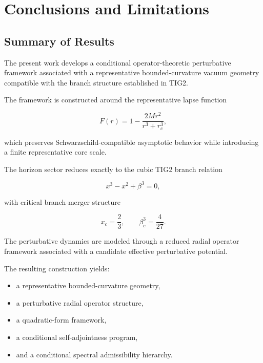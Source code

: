 
\section{Conclusions and Limitations}

\subsection{Summary of Results}

The present work develops a conditional operator-theoretic perturbative framework associated with a representative bounded-curvature vacuum geometry compatible with the branch structure established in TIG2.

The framework is constructed around the representative lapse function

\begin{equation}
F(r)
=
1
-
\frac{2Mr^2}{r^3+r_c^3},
\end{equation}

which preserves Schwarzschild-compatible asymptotic behavior while introducing a finite representative core scale.

The horizon sector reduces exactly to the cubic TIG2 branch relation

\begin{equation}
x^3 - x^2 + \beta^3 = 0,
\end{equation}

with critical branch-merger structure

\begin{equation}
x_c = \frac{2}{3},
\qquad
\beta_c^3 = \frac{4}{27}.
\end{equation}

The perturbative dynamics are modeled through a reduced radial operator framework associated with a candidate effective perturbative potential.

The resulting construction yields:
\begin{itemize}[leftmargin=0.6cm]
\item a representative bounded-curvature geometry,
\item a perturbative radial operator structure,
\item a quadratic-form framework,
\item a conditional self-adjointness program,
\item and a conditional spectral admissibility hierarchy.
\end{itemize}

